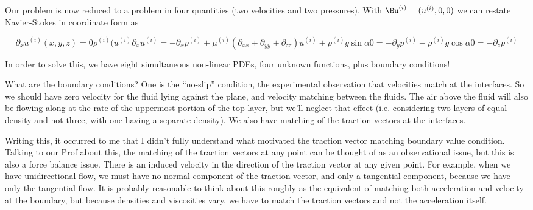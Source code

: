 Our problem is now reduced to a problem in four quantities (two velocities and two pressures).  With $\Bu^{(i)} = (u^{(i)}, 0, 0)$ we can restate Navier-Stokes in coordinate form as

\begin{subequations}
\label{eqn:twoLayerInclinedFlowDifferentDensities:50}
\begin{equation}\label{eqn:twoLayerInclinedFlowDifferentDensities:110}
\partial_x u^{(i)}(x,y,z) = 0
\end{equation}
\begin{equation}\label{eqn:twoLayerInclinedFlowDifferentDensities:130}
\rho^{(i)} (u^{(i)} \partial_x u^{(i)} = - \partial_x p^{(i)} + \mu^{(i)} (\partial_{xx} + \partial_{yy} + \partial_{zz}) u^{(i)} + \rho^{(i)} g \sin\alpha 
\end{equation}
\begin{equation}\label{eqn:twoLayerInclinedFlowDifferentDensities:150}
0 = - \partial_y p^{(i)} - \rho^{(i)} g \cos\alpha 
\end{equation}
\begin{equation}\label{eqn:twoLayerInclinedFlowDifferentDensities:155}
0 = - \partial_z p^{(i)} 
\end{equation}
\end{subequations}

In order to solve this, we have eight simultaneous non-linear PDEs, four unknown functions, plus boundary conditions!

What are the boundary conditions?  One is the ``no-slip'' condition, the experimental observation that velocities match at the interfaces.  So we should have zero velocity for the fluid lying against the plane, and velocity matching between the fluids.  The air above the fluid will also be flowing along at the rate of the uppermost portion of the top layer, but we'll neglect that effect (i.e. considering two layers of equal density and not three, with one having a separate density).  We also have matching of the traction vectors at the interfaces.  

Writing this, it occurred to me that I didn't fully understand what motivated the traction vector matching boundary value condition.  Talking to our Prof about this, the matching of the traction vectors at any point can be thought of as an observational issue, but this is also a force balance issue.  There is an induced velocity in the direction of the traction vector at any given point.  For example, when we have unidirectional flow, we must have no normal component of the traction vector, and only a tangential component, because we have only the tangential flow.  It is probably reasonable to think about this roughly as the equivalent of matching both acceleration and velocity at the boundary, but because densities and viscosities vary, we have to match the traction vectors and not the acceleration itself.

